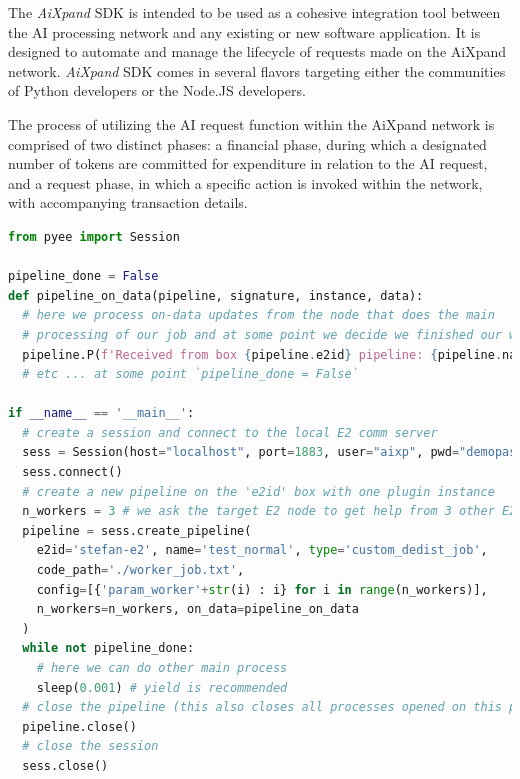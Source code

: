 \documentclass{article}
\begin{document}
The \textit{AiXpand} SDK is intended to be used as a cohesive integration tool between the AI processing network and any existing or new software application. It is designed to automate and manage the lifecycle of requests made on the AiXpand network. \textit{AiXpand} SDK comes in several flavors targeting either the communities of Python developers or the Node.JS developers.

The process of utilizing the AI request function within the AiXpand network is comprised of two distinct phases: a financial phase, during which a designated number of tokens are committed for expenditure in relation to the AI request, and a request phase, in which a specific action is invoked within the network, with accompanying transaction details.

\begin{lstlisting}[language=Python, caption={A simple Python example based on PyEE package where we use our own local node to distribute a job. The main pipeline will perform basic aggregation of worker progress data and the client can consume the results asynchronously. \textit{Please note that this is a orientative example as the PyEE package is still in early phase and new methods and subpackages are being added}}, label={lst:pyee}]
from pyee import Session

pipeline_done = False
def pipeline_on_data(pipeline, signature, instance, data):
  # here we process on-data updates from the node that does the main
  # processing of our job and at some point we decide we finished our work
  pipeline.P(f'Received from box {pipeline.e2id} pipeline: {pipeline.name}:{signature}:{instance}')
  # etc ... at some point `pipeline_done = False`

if __name__ == '__main__':
  # create a session and connect to the local E2 comm server
  sess = Session(host="localhost", port=1883, user="aixp", pwd="demopass")
  sess.connect()
  # create a new pipeline on the 'e2id' box with one plugin instance
  n_workers = 3 # we ask the target E2 node to get help from 3 other E2s
  pipeline = sess.create_pipeline(
    e2id='stefan-e2', name='test_normal', type='custom_dedist_job', 
    code_path='./worker_job.txt', 
    config=[{'param_worker'+str(i) : i} for i in range(n_workers)],
    n_workers=n_workers, on_data=pipeline_on_data
  )
  while not pipeline_done:
    # here we can do other main process 
    sleep(0.001) # yield is recommended  
  # close the pipeline (this also closes all processes opened on this pipeline)
  pipeline.close()
  # close the session
  sess.close()
\end{lstlisting}
\end{document}
